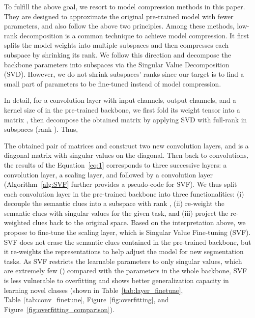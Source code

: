 \documentclass{article}
\begin{document}
To fulfill the above goal, we resort to model compression methods in this paper. They are designed to approximate the original pre-trained model with fewer parameters, and also follow the above two principles. Among these methods, low-rank decomposition is a common technique to achieve model compression. It first splits the model weights into multiple subspaces and then compresses each subspace by shrinking its rank. We follow this direction and decompose the backbone parameters into subspaces via the Singular Value Decomposition (SVD). However, we do not shrink subspaces' ranks since our target is to find a small part of parameters to be fine-tuned instead of model compression.

In detail, for a convolution layer with  input channels,  output channels, and a kernel size of  in the pre-trained backbone, we first fold its weight tensor  into a matrix , then decompose the obtained matrix by applying SVD with full-rank in subspaces (rank ). Thus,

The obtained pair of matrices  and  construct two new convolution layers, and  is a diagonal matrix with singular values on the diagonal. Then back to convolutions, the results of the Equation~\ref{eq:1} corresponds to three successive layers: a  convolution layer, a scaling layer, and followed by a  convolution layer (Algorithm~\ref{alg:SVF} further provides a pseudo-code for SVF). We thus split each convolution layer in the pre-trained backbone into three functionalities: (i) decouple the semantic clues into a subspace with rank , (ii) re-weight the semantic clues with singular values for the given task, and (iii) project the re-weighted clues back to the original space. Based on the interpretation above, we propose to fine-tune the scaling layer, which is Singular Value Fine-tuning (SVF). SVF does not erase the semantic clues contained in the pre-trained backbone, but it re-weights the representations to help adjust the model for new segmentation tasks. As SVF restricts the learnable parameters to only singular values, which are extremely few () compared with the parameters in the whole backbone, SVF is less vulnerable to overfitting and shows better generalization capacity in learning novel classes (shown in Table~\ref{tab:layer_finetune}, Table~\ref{tab:conv_finetune}, Figure~\ref{fig:overfitting}, and Figure~\ref{fig:overfitting_comparison}).


\vspace{-.4em}
\end{document}
